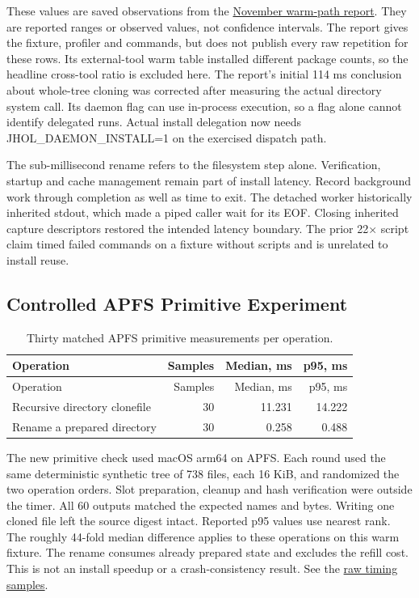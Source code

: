 \documentclass[
  11pt,
  letterpaper,
]{article}
\begin{document}
These values are saved observations from the
\href{../REPORT-2026-11-10.md}{November warm-path report}. They are
reported ranges or observed values, not confidence intervals. The report
gives the fixture, profiler and commands, but does not publish every raw
repetition for these rows. Its external-tool warm table installed
different package counts, so the headline cross-tool ratio is excluded
here. The report's initial 114 ms conclusion about whole-tree cloning
was corrected after measuring the actual directory system call. Its
daemon flag can use in-process execution, so a flag alone cannot
identify delegated runs. Actual install delegation now needs
JHOL\_DAEMON\_INSTALL=1 on the exercised dispatch path.

The sub-millisecond rename refers to the filesystem step alone.
Verification, startup and cache management remain part of install
latency. Record background work through completion as well as time to
exit. The detached worker historically inherited stdout, which made a
piped caller wait for its EOF. Closing inherited capture descriptors
restored the intended latency boundary. The prior 22× script claim timed
failed commands on a fixture without scripts and is unrelated to install
reuse.

\subsection{Controlled APFS Primitive
Experiment}\label{controlled-apfs-primitive-experiment}

\begin{longtable}[]{@{}lrrr@{}}
\caption{Thirty matched APFS primitive measurements per
operation.}\tabularnewline
\toprule\noalign{}
Operation & Samples & Median, ms & p95, ms \\
\midrule\noalign{}
\endfirsthead
\toprule\noalign{}
Operation & Samples & Median, ms & p95, ms \\
\midrule\noalign{}
\endhead
\bottomrule\noalign{}
\endlastfoot
Recursive directory clonefile & 30 & 11.231 & 14.222 \\
Rename a prepared directory & 30 & 0.258 & 0.488 \\
\end{longtable}

The new primitive check used macOS arm64 on APFS. Each round used the
same deterministic synthetic tree of 738 files, each 16 KiB, and
randomized the two operation orders. Slot preparation, cleanup and hash
verification were outside the timer. All 60 outputs matched the expected
names and bytes. Writing one cloned file left the source digest intact.
Reported p95 values use nearest rank. The roughly 44-fold median
difference applies to these operations on this warm fixture. The rename
consumes already prepared state and excludes the refill cost. This is
not an install speedup or a crash-consistency result. See the
\href{../architecture/experiments/paper-apfs-replay-primitives-2026-11-12.json}{raw
timing samples}.
\end{document}
